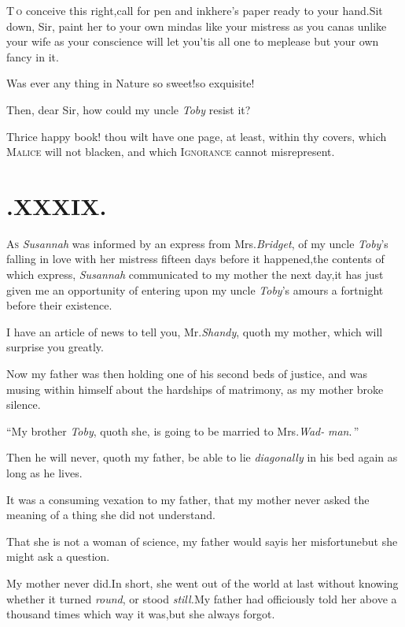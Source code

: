 \documentclass{article}
\begin{document}
\lettrine{T}{\,o} conceive this right,\tsk call
for pen and ink\tsk here’s paper ready to your
hand.\tsh Sit down, Sir, paint her to your own
mind\tsh as like your mistress as you can\tsh as
unlike your wife as your conscience will let you\tsk ’tis
all one to me\tsh please but your own fancy in it.

\newpage
\hbox{}
\newpage
\tsh Was ever any thing in Nature so sweet!\tsk so
exquisite!

\tsh Then, dear Sir, how could my uncle \textit{Toby}
resist it?

Thrice happy book! thou wilt have one page, at least, within thy
covers, which \textsc{Malice} will not blacken, and which
\textsc{Ignorance} cannot misrepresent.

\section{.\enspace XXXIX.}

\lettrine{A}{s} \textit{Susannah} was informed by an
express from Mrs.\@ \textit{Bridget}, of my uncle \textit{Toby}’s
falling in love with her mistress fifteen days before it
happened,\break\tsk the contents of which express, \textit{Susannah}
communicated to my mother the next day,\tsk it has just given me
an opportunity of entering upon my uncle \textit{Toby}’s amours
a fortnight before their existence.

I have an article of news to tell you, Mr.\@ \textit{Shandy}, quoth
my mother, which will surprise you greatly.\tsh

Now my father was then holding one of his second beds of
justice, and was musing within himself about the hardships of
matrimony, as my mother broke silence.\tsh

“\tsk My brother \textit{Toby}, quoth she,\break
\lqq is going to be married to Mrs.\@ \textit{Wad-}\break
\lqq \textit{man}.\,”

\tsh Then he will never, quoth my father, be able to
lie \textit{diagonally} in his bed again as long as he lives.

It was a consuming vexation to my father, that my mother never
asked the meaning of a thing she did not understand.

\tsh That she is not a woman of science, my father
would say\tsk is her misfortune\tsk but she might ask a
question.\tsk 

My mother never did.\tsh In short, she went out of the
world at last without knowing whether it turned \textit{round}, or
stood \textit{still.}\tsh My father had officiously told her
above a thousand times which way it was,\tsk but she always
forgot.
\end{document}

